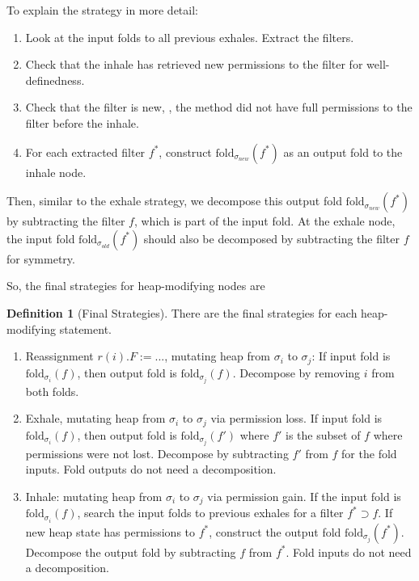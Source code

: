\documentclass[msc,oneside]{ubcthesis}
\theoremstyle{definition}
\newtheorem{definition}{Definition}
\begin{document}
To explain the strategy in more detail:
\begin{enumerate}
    \item Look at the input folds to all previous exhales. Extract the filters.
    \item Check that the inhale has retrieved new permissions to the filter for well-definedness. 
    \item Check that the filter is new, \ie, the method did not have full permissions to the filter before the inhale. 
    \item For each extracted filter $f^*$, construct $\textrm{fold}_{\sigma_{new}}(f^*)$ as an output fold to the inhale node.
\end{enumerate}

Then, similar to the exhale strategy, we decompose this output fold $\textrm{fold}_{\sigma_{new}}(f^*)$ by subtracting the filter $f$, which is part of the input fold. At the exhale node, the input fold $\textrm{fold}_{\sigma_{old}}(f^*)$ should also be decomposed by subtracting the filter $f$ for symmetry. 

So, the final strategies for heap-modifying nodes are
\begin{definition}[Final Strategies] \label{strat:final}
There are the final strategies for each heap-modifying statement.
\begin{enumerate} 
    \item Reassignment $r(i).F := ...$, mutating heap from $\sigma_i$ to $\sigma_j$: 
    If input fold is $\textrm{fold}_{\sigma_i}(f)$, then output fold is $\textrm{fold}_{\sigma_j}(f)$. 
    Decompose by removing $i$ from both folds.
    \item Exhale, mutating heap from $\sigma_i$ to $\sigma_j$ via permission loss. If input fold is $\textrm{fold}_{\sigma_i}(f)$, then output fold is $\textrm{fold}_{\sigma_j}(f')$ where $f'$ is the subset of $f$ where permissions were not lost. Decompose by subtracting $f'$ from $f$ for the fold inputs. Fold outputs do not need a decomposition.
    \item Inhale: mutating heap from $\sigma_i$ to $\sigma_j$ via permission gain. If the input fold is $\textrm{fold}_{\sigma_i}(f)$, search the input folds to previous exhales for a filter $f^* \supset f$. If new heap state has permissions to $f^*$, construct the output fold $\textrm{fold}_{\sigma_j}(f^*)$. Decompose the output fold by subtracting $f$ from $f^*$. Fold inputs do not need a decomposition.
\end{enumerate}
\end{definition}
\end{document}
